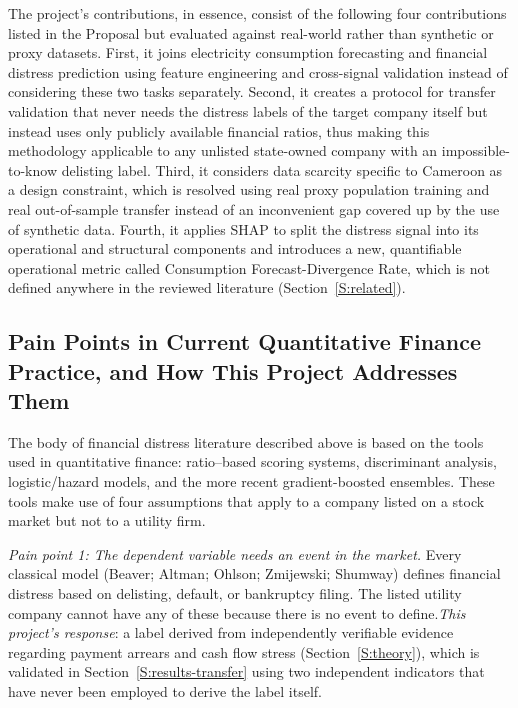\documentclass[final,1p,times]{elsarticle}
\begin{document}
The project's contributions, in essence, consist of the following four contributions listed in the Proposal but evaluated against real-world rather than synthetic or proxy datasets. First, it joins electricity consumption forecasting and financial distress prediction using feature engineering and cross-signal validation instead of considering these two tasks separately. Second, it creates a protocol for transfer validation that never needs the distress labels of the target company itself but instead uses only publicly available financial ratios, thus making this methodology applicable to any unlisted state-owned company with an impossible-to-know delisting label. Third, it considers data scarcity specific to Cameroon as a design constraint, which is resolved using real proxy population training and real out-of-sample transfer instead of an inconvenient gap covered up by the use of synthetic data. Fourth, it applies SHAP to split the distress signal into its operational and structural components and introduces a new, quantifiable operational metric called Consumption Forecast-Divergence Rate, which is not defined anywhere in the reviewed literature (Section~\ref{S:related}).

\subsection{Pain Points in Current Quantitative Finance Practice, and How This Project Addresses Them}
\label{S:painpoints}

The body of financial distress literature described above is based on the tools used in quantitative finance: ratio--based scoring systems, discriminant analysis, logistic/hazard models, and the more recent gradient-boosted ensembles. These tools make use of four assumptions that apply to a company listed on a stock market but not to a utility firm.

\emph{Pain point 1: The dependent variable needs an event in the market.} Every classical model (Beaver; Altman; Ohlson; Zmijewski; Shumway) defines financial distress based on delisting, default, or bankruptcy filing. The listed utility company cannot have any of these because there is no event to define.\emph{This project's response}: a label derived from independently verifiable evidence regarding payment arrears and cash flow stress (Section~\ref{S:theory}), which is validated in Section~\ref{S:results-transfer} using two independent indicators that have never been employed to derive the label itself.
\end{document}
